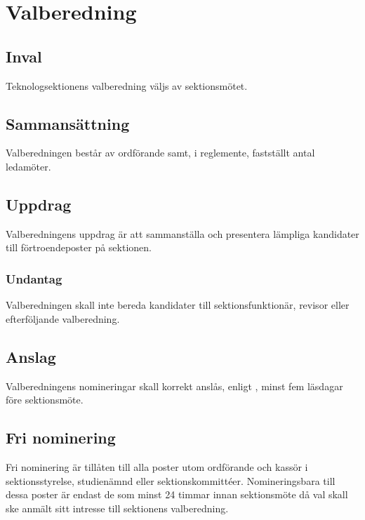 \section{Valberedning}

\subsection{Inval}
Teknologsektionens valberedning väljs av sektionsmötet.

\subsection{Sammansättning}
Valberedningen består av ordförande samt, i reglemente, fastställt antal ledamöter.

\subsection{Uppdrag}
Valberedningens uppdrag är att sammanställa och presentera lämpliga kandidater till förtroendeposter på sektionen.

\subsubsection{Undantag}
\label{sec:valberedning:undantag}
Valberedningen skall inte bereda kandidater till sektionsfunktionär, revisor eller efterföljande valberedning.

\subsection{Anslag}
Valberedningens nomineringar skall korrekt anslås, enligt , minst fem läsdagar före sektionsmöte.

\subsection{Fri nominering}
Fri nominering är tillåten till alla poster utom ordförande och kassör i sektionsstyrelse, studienämnd eller sektionskommittéer. Nomineringsbara till dessa poster är endast de som minst 24 timmar innan sektionsmöte då val skall ske anmält sitt intresse till sektionens valberedning.
